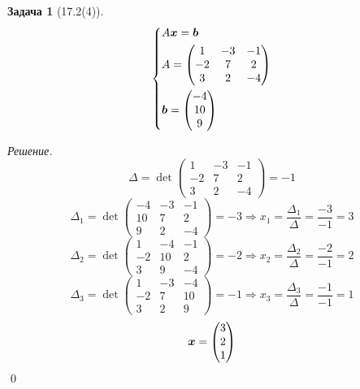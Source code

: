\documentclass[a4paper,12pt]{article}
\newtheorem*{problem}{Задача}
\theoremstyle{definition}
\theoremstyle{remark}
\theoremstyle{remark}
\begin{document}
  \begin{problem}[17.2(4)]
    \[
      \left\{
        \begin{aligned}
          &A \boldsymbol x = \boldsymbol b\\
          &A = \begin{pmatrix}
            1 & -3 & -1\\
            -2 & 7 & 2\\
            3 & 2 & -4
          \end{pmatrix}\\
          &\boldsymbol b = \begin{pmatrix}
            -4\\ 10\\ 9
          \end{pmatrix}
        \end{aligned}
      \right.
    \]
  \end{problem}
  
  \emph{Решение.}
  \[
    \Delta = \det \begin{pmatrix}
      1 & -3 & -1\\
      -2 & 7 & 2\\
      3 & 2 & -4
    \end{pmatrix} = -1
  \]
  \[
    \Delta_1 = \det \begin{pmatrix}
      -4 & -3 & -1\\
      10 & 7 & 2\\
      9 & 2 & -4
    \end{pmatrix} = -3 \Rightarrow x_1 = \frac{\Delta_1}{\Delta} = \frac{-3}{-1} = 3
  \]
  \[
    \Delta_2 = \det \begin{pmatrix}
      1 & -4 & -1\\
      -2 & 10 & 2\\
      3 & 9 & -4
    \end{pmatrix} = -2 \Rightarrow x_2 = \frac{\Delta_2}{\Delta} = \frac{-2}{-1} = 2
  \]
  \[
    \Delta_3 = \det \begin{pmatrix}
      1 & -3 & -4\\
      -2 & 7 & 10\\
      3 & 2 & 9
    \end{pmatrix} = -1 \Rightarrow x_3 = \frac{\Delta_3}{\Delta} = \frac{-1}{-1} = 1
  \]
  \[
    \boldsymbol x = \begin{pmatrix}
      3\\ 2\\ 1
    \end{pmatrix}
  \]
  \qed
  
\end{document}
